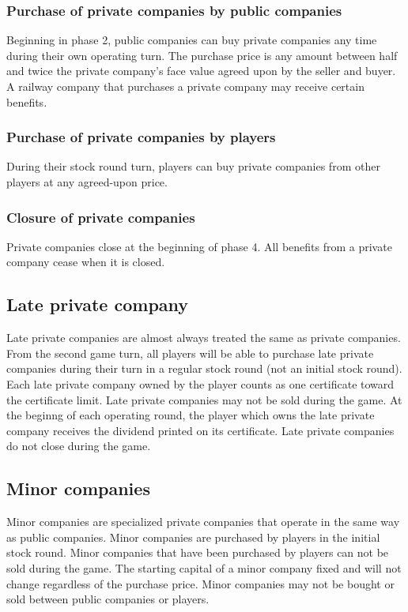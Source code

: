 \documentclass{article}
\begin{document}
\begin{CJK}{UTF8}{min}
\begin{multicols}{2}
\subsubsection{Purchase of private companies by public companies}
Beginning in phase 2, public companies can buy private companies
any time during their own operating turn. The purchase price is any
amount between half and twice the private company's face value agreed
upon by the seller and buyer.  A railway company that purchases a
private company may receive certain benefits.

\subsubsection{Purchase of private companies by players}
During their stock round turn, players can buy private companies from
other players at any agreed-upon price.

\subsubsection{Closure of private companies}
Private companies close at the beginning of phase 4. All benefits from
a private company cease when it is closed.

\subsection{Late private company}
Late private companies are almost always treated the same as private
companies. From the second game turn, all players will be able to
purchase late private companies during their turn in a regular stock
round (not an initial stock round). Each late private company owned by
the player counts as one certificate toward the certificate
limit. Late private companies may not be sold during the game. At the
beginng of each operating round, the player which owns the late
private company receives the dividend printed on its certificate. Late
private companies do not close during the game.

\subsection{Minor companies}
Minor companies are specialized private companies that operate in the
same way as public companies. Minor companies are purchased by players
in the initial stock round. Minor companies that have been purchased
by players can not be sold during the game. The starting capital of a
minor company fixed and will not change regardless of the purchase
price. Minor companies may not be bought or sold between public
companies or players.


\end{multicols}
\end{CJK}
\end{document}
